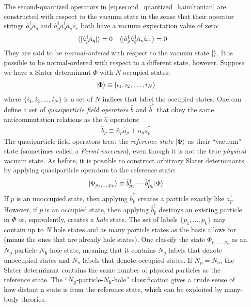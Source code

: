 The second-quantized operators in \eqref{eq:second_quantized_hamiltonian} are constructed with respect to the vacuum state in the sense that their operator strings $\hat{a}_p^\dagger \hat{a}_q$ and $\hat{a}_p^\dagger \hat{a}_q^\dagger \hat{a}_s \hat{a}_r$ both have a vacuum expectation value of zero:
\begin{align*}
&\langle  | \hat{a}_p^\dagger \hat{a}_q |  \rangle = 0 &
&\langle  | \hat{a}_p^\dagger \hat{a}_q^\dagger \hat{a}_s \hat{a}_r |  \rangle = 0
\end{align*}
They are said to be \emph{normal-ordered} with respect to the vacuum state $|  \rangle$.  It is possible to be normal-ordered with respect to a different state, however.  Suppose we have a Slater determinant $\Phi$ with $N$ occupied states:
\begin{align*}
  | \Phi \rangle \equiv | i_1, i_2, \ldots, i_N \rangle
\end{align*}
where $\{i_1, i_2, \ldots, i_N\}$ is a set of $N$ indices that label the occupied states.  One can define a set of \textit{quasiparticle field operators} $\hat b$ and $\hat b^\dagger$ that obey the same anticommutation relations as the $\hat a$ operators:
\begin{align*}
  \hat b_p \equiv \bar n_p \hat a_{p} + n_p \hat a_{p}^\dagger
\end{align*}
The quasiparticle field operators treat the \textit{reference state} $| \Phi \rangle$ as their ``vacuum'' state (sometimes called a \textit{Fermi vaccuum}), even though it is not the true \emph{physical} vacuum state.  As before, it is possible to construct arbitrary Slater determinants by applying quasiparticle operators to the reference state:
\begin{align}
  | \Phi_{p_1, \ldots, p_k} \rangle \equiv \hat{b}^\dagger_{p_1} \cdots \hat{b}^\dagger_{p_k} | \Phi \rangle
  \label{eq:quasisd}
\end{align}
If $p$ is an unoccupied state, then applying $\hat{b}_p^\dagger$ creates a particle exactly like $\hat{a}_p^\dagger$.  However, if $p$ is an occupied state, then applying $\hat{b}_p^\dagger$ destroys an existing particle in $\Phi$ or, equivalently, creates a \textit{hole} state.  The set of labels $\{p_1, \ldots, p_k\}$ may contain up to $N$ hole states and as many particle states as the basis allows for (minus the ones that are already hole states).  One classify the state $\Phi_{p_1, \ldots, p_k}$ as an $N_{\text{p}}$-particle-$N_{\text{h}}$-hole state, meaning that it contains $N_{\text{p}}$ labels that denote unoccupied states and $N_{\text{h}}$ labels that denote occupied states.  If $N_{\text{p}} = N_{\text{h}}$, the Slater determinant contains the same number of physical particles as the reference state.  The ``$N_{\text{p}}$-particle-$N_{\text{h}}$-hole'' classification gives a crude sense of how distant a state is from the reference state, which can be exploited by many-body theories.

